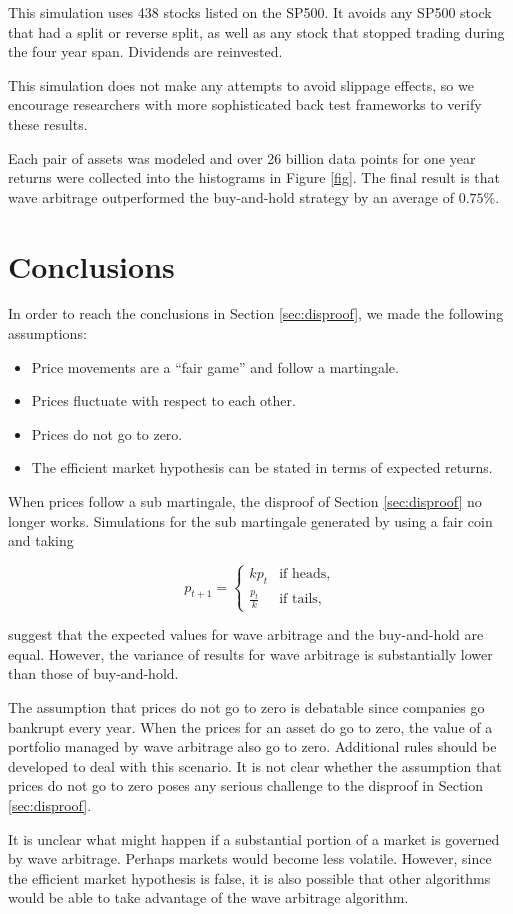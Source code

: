 \documentclass{article}
\begin{document}
This simulation uses 438 stocks listed on the SP500. It avoids any SP500 stock
that had a split or reverse split, as well as any stock that stopped trading
during the four year span. Dividends are reinvested.

This simulation does not make any attempts to avoid slippage effects, so we
encourage researchers with more sophisticated back test frameworks to verify
these results.

Each pair of assets was modeled and over 26 billion data points for one year
returns were collected into the histograms in Figure \ref{fig}. The final
result is that wave arbitrage outperformed the buy-and-hold strategy by an
average of $0.75\%$.

\section{Conclusions}

In order to reach the conclusions in Section \ref{sec:disproof}, we made the following assumptions:

\begin{itemize}
  \item Price movements are a ``fair game'' and follow a martingale.
  \item Prices fluctuate with respect to each other.
  \item Prices do not go to zero.
  \item The efficient market hypothesis can be stated in terms of expected
        returns.
\end{itemize}

When prices follow a sub martingale, the disproof of Section \ref{sec:disproof}
no longer works. Simulations for the sub martingale generated by using a fair coin and taking

\begin{equation}
  p_{t+1} =
    \begin{cases}
      k p_t         & \mbox{if heads,} \\
      \frac{p_t}{k} & \mbox{if tails,}
    \end{cases}
\end{equation}

suggest that the expected values for wave arbitrage and the buy-and-hold are
equal. However, the variance of results for wave arbitrage is substantially
lower than those of buy-and-hold.

The assumption that prices do not go to zero is debatable since companies go
bankrupt every year. When the prices for an asset do go to zero, the value of a
portfolio managed by wave arbitrage also go to zero. Additional rules should be
developed to deal with this scenario. It is not clear whether the assumption
that prices do not go to zero poses any serious challenge to the disproof in
Section \ref{sec:disproof}.

It is unclear what might happen if a substantial portion of a market is
governed by wave arbitrage. Perhaps markets would become less volatile.
However, since the efficient market hypothesis is false, it is also possible
that other algorithms would be able to take advantage of the wave arbitrage
algorithm.



\end{document}
